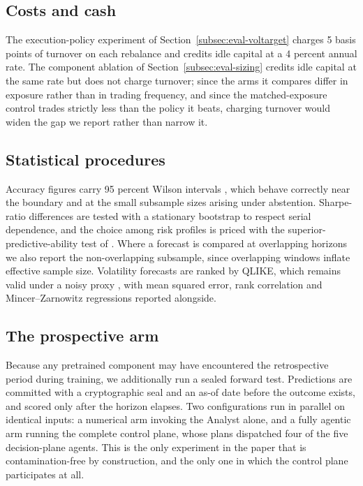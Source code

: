 \documentclass[pdflatex,sn-apa]{sn-jnl}%
\theoremstyle{thmstyleone}%
\theoremstyle{thmstyletwo}%
\theoremstyle{thmstylethree}%
\begin{document}
\subsection{Costs and cash}\label{subsec:protocol-costs}

The execution-policy experiment of Section~\ref{subsec:eval-voltarget} charges
5 basis points of turnover on each rebalance and credits idle capital at a
4 percent annual rate. The component ablation of
Section~\ref{subsec:eval-sizing} credits idle capital at the same rate but does
not charge turnover; since the arms it compares differ in exposure rather than
in trading frequency, and since the matched-exposure control trades strictly
less than the policy it beats, charging turnover would widen the gap we report
rather than narrow it.

\subsection{Statistical procedures}\label{subsec:protocol-stats}

Accuracy figures carry 95 percent Wilson intervals
\citep{wilson1927probable}, which behave correctly near the boundary and at the
small subsample sizes arising under abstention. Sharpe-ratio differences are
tested with a stationary bootstrap \citep{politis1994stationary} to respect
serial dependence, and the choice among risk profiles is priced with the
superior-predictive-ability test of \citet{hansen2005spa}. Where a forecast is
compared at overlapping horizons we also report the non-overlapping subsample,
since overlapping windows inflate effective sample size. Volatility forecasts
are ranked by QLIKE, which remains valid under a noisy proxy
\citep{patton2011volatility}, with mean squared error, rank correlation and
Mincer--Zarnowitz regressions reported alongside.

\subsection{The prospective arm}\label{subsec:protocol-forward}

Because any pretrained component may have encountered the retrospective period
during training, we additionally run a sealed forward test. Predictions are
committed with a cryptographic seal and an as-of date before the outcome
exists, and scored only after the horizon elapses. Two configurations run in
parallel on identical inputs: a numerical arm invoking the Analyst alone, and a
fully agentic arm running the complete control plane, whose plans dispatched
four of the five decision-plane agents. This is the only experiment in the paper
that is contamination-free by construction, and the only one in which the
control plane participates at all.
\end{document}
